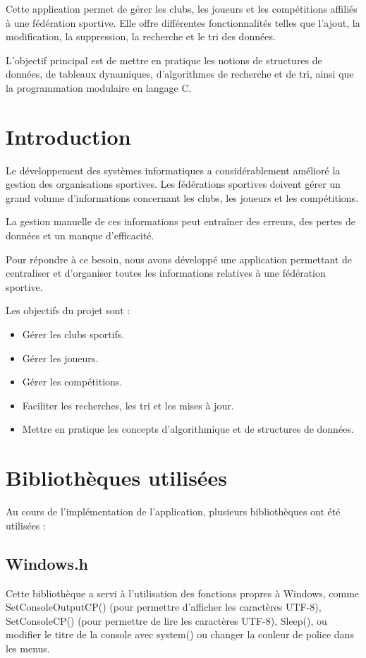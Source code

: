 \documentclass[12pt,a4paper]{report}
\begin{document}
Cette application permet de gérer les clubs, les joueurs et les compétitions affiliés à une fédération sportive. Elle offre différentes fonctionnalités telles que l'ajout, la modification, la suppression, la recherche et le tri des données.

L'objectif principal est de mettre en pratique les notions de structures de données, de tableaux dynamiques, d'algorithmes de recherche et de tri, ainsi que la programmation modulaire en langage C.

\chapter{Introduction}
Le développement des systèmes informatiques a considérablement amélioré la gestion des organisations sportives. Les fédérations sportives doivent gérer un grand volume d'informations concernant les clubs, les joueurs et les compétitions.

La gestion manuelle de ces informations peut entraîner des erreurs, des pertes de données et un manque d'efficacité.

Pour répondre à ce besoin, nous avons développé une application permettant de centraliser et d'organiser toutes les informations relatives à une fédération sportive.

Les objectifs du projet sont :

\begin{itemize}
	\item Gérer les clubs sportifs.
	\item Gérer les joueurs.
	\item Gérer les compétitions.
	\item Faciliter les recherches, les tri et les mises à jour.
	\item Mettre en pratique les concepts d'algorithmique et de structures de données.
\end{itemize}

\chapter{Bibliothèques utilisées}
Au cours de l'implémentation de l'application, plusieurs bibliothèques ont été utilisées : 

\section{Windows.h}
Cette bibliothèque a servi à l'utilisation des  fonctions propres à Windows, comme SetConsoleOutputCP() (pour permettre d'afficher les caractères UTF-8), SetConsoleCP() (pour permettre de lire les caractères UTF-8), Sleep(), ou modifier le titre de la console avec system() ou changer la couleur de police dans les menus.
\end{document}
